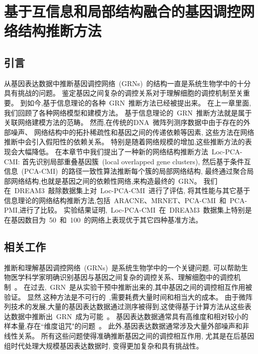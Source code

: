 \section{基于互信息和局部结构融合的基因调控网络结构推断方法}
\label{sec:locpcacmi}

\subsection{引言}

从基因表达数据中推断基因调控网络~(GRNs)~的结构一直是系统生物学中的十分具有挑战的问题。
鉴定基因之间复杂的调控关系对于理解细胞的调控机制至关重要。
到如今,基于信息理论的各种~GRN~推断方法已经被提出来。
在上一章里面, 我们回顾了各种网络模型和建模方法。
基于信息理论的~GRN~推断方法就是属于关联网络建模方法的范畴。
然而,在传统的DNA~微阵列测序数据中由于存在的外部噪声、
网络结构中的拓扑稀疏性和基因之间的传递依赖等因素,
这些方法在网络推断中会引入假阳性的依赖关系。
特别是随着网络规模的增加,这些推断方法的表现会大幅降低。
在本章节中我们提出了一种新的网络结构推断方法~Loc-PCA-CMI:
首先识别局部重叠基因簇~(local overlapped gene clusters),
然后基于条件互信息~(PCA-CMI)~的路径一致性算法推断每个簇的局部网络结构,
最终通过聚合局部网络结构,也就是基因之间的依赖性网络,来构造最终的~GRN。
我们在~DREAM3~敲除数据集上对~Loc-PCA-CMI~进行了评估,
将其性能与其它基于信息理论的网络结构推断方法,包括~ARACNE、MRNET、PCA-CMI~和~PCA-PMI,进行了比较。
实验结果证明,~Loc-PCA-CMI~在~DREAM3~数据集上特别是在基因数目为~50~和~100~的网络上表现优于其它四种基准方法。

\subsection{相关工作}

推断和理解基因调控网络~(GRNs)~是系统生物学中的一个关键问题, 
可以帮助生物医学科学家明确识别基因与基因之间复杂的调控关系、理解细胞中的调控机制~\cite{altay2010inferring, basso2005reverse}。
在过去,~GRN~是从实验干预中推断出来的,其中基因之间的调控相互作用被验证。
显然,这种方法是不可行的~\cite{elnitski2006locating},需要耗费大量时间和相当大的成本。
由于微阵列技术的发展,大量的基因表达数据通过测序被得到,这使得基于计算方法从这些表达数据中推断出~GRN~成为可能~\cite{maetschke2013supervised}。
基因表达数据通常具有高维度和相对较小的样本量,存在``维度诅咒"的问题~\cite{wang2006inferring}。
此外,基因表达数据通常涉及大量外部噪声和非线性关系。
所有这些问题使得准确推断基因之间的调控相互作用,
尤其是在后基因组时代处理大规模基因表达数据时,
变得更加复杂和具有挑战性。

